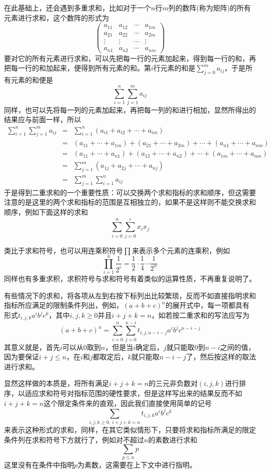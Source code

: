 在此基础上，还会遇到多重求和，比如对于一个$n$行$m$列的数阵(称为矩阵)的所有元素进行求和，这个数阵的形式为
\[
  \begin{pmatrix}
    a_{11} & a_{12} & \cdots & a_{1m} \\
    a_{21} & a_{22} & \cdots & a_{2m} \\
    \vdots & \vdots & \cdots & \vdots \\
    a_{n1} & a _{n2} & \cdots & a_{nm}
  \end{pmatrix}
\]
要对它的所有元素进行求和，可以先把每一行的元素加起来，得到每一行的和，再把每一行的和加起来，便得到所有元素的和。第$i$行元素的和是$\sum_{j=0}^ma_{ij}$，于是所有元素的和便是
\[ \sum_{i=1}^n \sum_{j=1}^m a_{ij} \]
同样，也可以先将每一列的元素加起来，再把每一列的和进行相加，显然所得出的结果应与前面一样，所以
\begin{eqnarray*}
  \sum_{i=1}^n \sum_{j=1}^m a_{ij} & = & \sum_{i=1}^n(a_{i1}+a_{i2}+\cdots+a_{im}) \\
                                   & = & (a_{11}+\cdots+a_{1m})+(a_{21}+\cdots+a_{2m})+\cdots+(a_{n1}+\cdots+a_{nm}) \\
                                   & = & (a_{11}+\cdots+a_{n1})+(a_{12}+\cdots+a_{n2})+\cdots+(a_{1m}+\cdots+a_{nm}) \\
                                   & = & \sum_{j=1}^m(a_{1j}+a_{2j}+\cdots+a_{nj}) \\
  & = & \sum_{j=1}^m\sum_{i=1}^na_{ij}
\end{eqnarray*}
于是得到二重求和的一个重要性质：可以交换两个求和指标的求和顺序，但这需要注意的是这里的两个求和指标的范围是互相独立的，如果不是这样则不能交换求和顺序，例如下面这样的求和
\[ \sum_{i=0}^n\sum_{j=0}^i x_ix_j \]

类比于求和符号，也可以用连乘积符号$\prod$来表示多个元素的连乘积，例如
\[ \prod_{i=1}^n \frac{1}{2^i} = \frac{1}{2} \cdot \frac{1}{4} \cdots \frac{1}{2^n} \]
同样也有多重求积，求积符号与求和符号有着类似的运算性质，不再重复说明了。

有些情况下的求和，将各项从左到右按下标列出比较繁琐，反而不如直接指明求和指标所应满足的限制条件列出，例如，$(a+b+c)^n$的展开式中，每一项都具有形式$t_{i,j,k}a^ib^jc^k$，其中$i,j,k \geqslant 0$并且$i+j+k=n$，如若按二重求和的写法应写为
\[ (a+b+c)^n = \sum_{i=0}^n \sum_{j=0}^{n-i} t_{i,j,n-i-j} a^i b^j c^{n-i-j} \]
其意义就是，首先$i$可以从$0$取到$n$，但是当$i$确定后，$j$就只能取$0$到$n-i$之间的值，因为要保证$i+j \leqslant n$，在$i$和$j$都取定后，$k$就只能取$n-i-j$了，然后按这样的取法进行求和。

显然这样做的本质是，将所有满足$i+j+k=n$的三元非负数对$(i,j,k)$进行排序，以适应求和符号对指标范围的硬性要求，但是这样写出来的结果反而不如$i+j+k=n$这个限定条件来的直观，因此我们直接使用简单的记号
\[ \sum_{i,j,k \geqslant 0, \  i+j+k=n} t_{i,j,k} a^ib^jc^k \]
来表示这种形式的求和，同样，在其它类似情形下，只要将求和指标所满足的限定条件列在求和符号下方就行了，例如对不超过$n$的素数进行求和
\[ \sum_{p \leqslant n}p \]
这里没有在条件中指明$p$为素数，这需要在上下文中进行指明。

